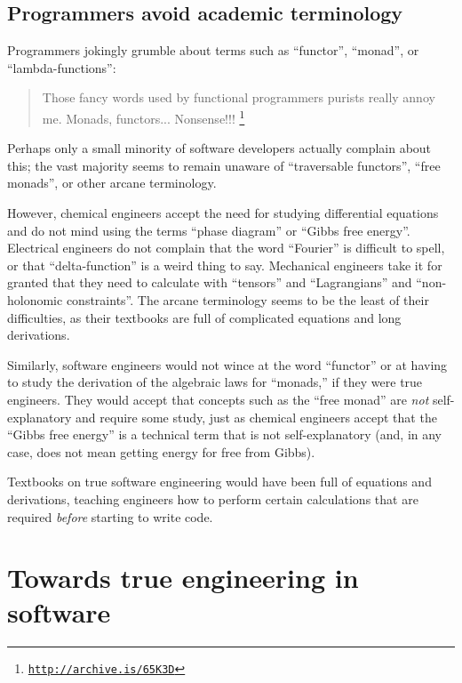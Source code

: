 \subsection{Programmers avoid academic terminology }

Programmers jokingly grumble about terms such as \textsf{``}functor\textsf{''}, \textsf{``}monad\textsf{''},
or \textsf{``}lambda-functions\textsf{''}:
\begin{quote}
{\small{}Those fancy words used by functional programmers purists
really annoy me. Monads, functors... Nonsense!!! }\footnote{\texttt{\href{http://archive.is/65K3D}{http://archive.is/65K3D}}}
\end{quote}
Perhaps only a small minority of software developers actually complain
about this; the vast majority seems to remain unaware of \textsf{``}traversable
functors\textsf{''}, \textsf{``}free monads\textsf{''}, or other arcane terminology.

However, chemical engineers accept the need for studying differential
equations and do not mind using the terms \textsf{``}phase diagram\textsf{''} or \textsf{``}Gibbs
free energy\textsf{''}. Electrical engineers do not complain that the word
\textsf{``}Fourier\textsf{''} is difficult to spell, or that \textsf{``}delta-function\textsf{''}
is a weird thing to say. Mechanical engineers take it for granted
that they need to calculate with \textsf{``}tensors\textsf{''} and \textsf{``}Lagrangians\textsf{''}
and \textsf{``}non-holonomic constraints\textsf{''}. The arcane terminology seems
to be the least of their difficulties, as their textbooks are full
of complicated equations and long derivations.

Similarly, software engineers would not wince at the word \textsf{``}functor\textsf{''}
or at having to study the derivation of the algebraic laws for \textsf{``}monads,\textsf{''}
\textemdash{} if they were true engineers. They would accept that
concepts such as the \textsf{``}free monad\textsf{''} are \emph{not} self-explanatory
and require some study, just as chemical engineers accept that the
\textsf{``}Gibbs free energy\textsf{''} is a technical term that is not self-explanatory
(and, in any case, does not mean getting energy for free from Gibbs). 

Textbooks on true software engineering would have been full of equations
and derivations, teaching engineers how to perform certain calculations
that are required \emph{before} starting to write code.

\section{Towards true engineering in software}

